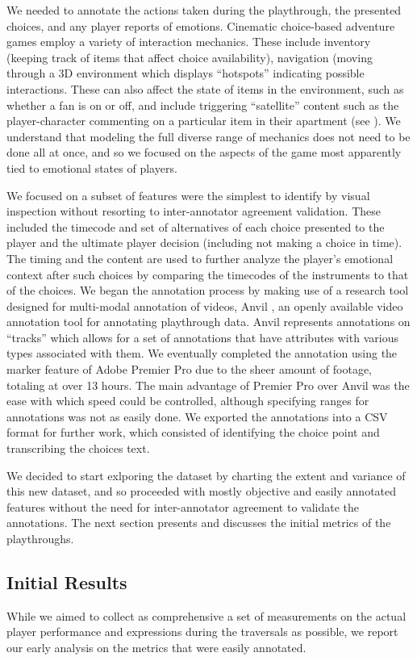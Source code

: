We needed to annotate the actions taken during the playthrough, the
presented choices, and any player reports of emotions. Cinematic
choice-based adventure games employ a variety of interaction
mechanics. These include inventory (keeping track of items that affect
choice availability), navigation (moving through a 3D environment
which displays “hotspots” indicating possible interactions. These can
also affect the state of items in the environment, such as whether a
fan is on or off, and include triggering “satellite” content such as
the player-character commenting on a particular item in their
apartment (see \cite{Chatman1980-rl}). We understand that modeling the
full diverse range of mechanics does not need to be done all at once,
and so we focused on the aspects of the game most apparently tied to
emotional states of players.

We focused on a subset of features were the simplest to identify by
visual inspection without resorting to inter-annotator agreement
validation. These included the timecode and set of alternatives of
each choice presented to the player and the ultimate player decision
(including not making a choice in time). The timing and the content
are used to further analyze the player’s emotional context after such
choices by comparing the timecodes of the instruments to that of the
choices. We began the annotation process by making use of a research
tool designed for multi-modal annotation of videos, Anvil
\cite{Bunt_undated-ey}, an openly available video annotation tool for
annotating playthrough data. Anvil represents annotations on “tracks”
which allows for a set of annotations that have attributes with
various types associated with them. We eventually completed the
annotation using the marker feature of Adobe Premier Pro due to the
sheer amount of footage, totaling at over 13 hours. The main advantage
of Premier Pro over Anvil was the ease with which speed could be
controlled, although specifying ranges for annotations was not as
easily done. We exported the annotations into a CSV format for further
work, which consisted of identifying the choice point and transcribing
the choices text.

We decided to start exlporing the dataset by charting the extent and
variance of this new dataset, and so proceeded with mostly objective
and easily annotated features without the need for inter-annotator
agreement to validate the annotations. The next section presents and
discusses the initial metrics of the playthroughs.
\subsection{Initial Results}
\label{sec:orgheadline10}
While we aimed to collect as comprehensive a set of measurements on
the actual player performance and expressions during the traversals as
possible, we report our early analysis on the metrics that were easily
annotated.

